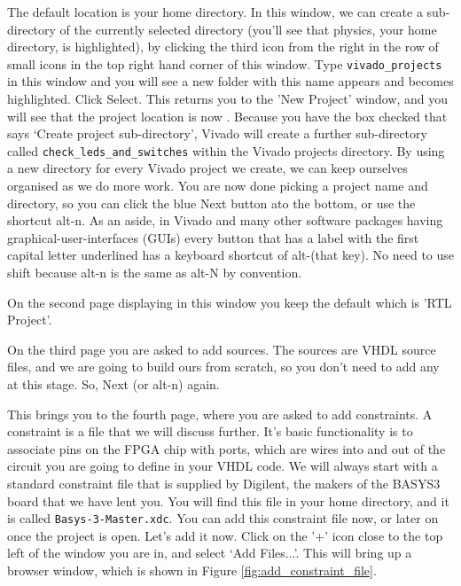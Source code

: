 \documentclass[../physical_computing.tex]{subfiles}
\begin{document}
The default location is your home directory. In this window, we can create a sub-directory of the currently selected directory (you'll see that physics, your home directory, is highlighted), by clicking the third icon from the right in the row of small icons in the top right hand corner of this window. Type \texttt{vivado\_projects} in this window and you will see a new folder with this name appears and becomes highlighted. Click Select. This returns you to the 'New Project' window, and you will see that the project location is now . Because you have the box checked that says `Create project sub-directory', Vivado will create a further sub-directory called \texttt{check\_leds\_and\_switches} within the Vivado projects directory. By using a new directory for every Vivado project we create, we can keep ourselves organised as we do more work. You are now done picking a project name and directory, so you can click the blue Next button ato the bottom, or use the shortcut alt-n. As an aside, in Vivado and many other software packages having graphical-user-interfaces (GUIs) every button that has a label with the first capital letter underlined has a keyboard shortcut of alt-(that key). No need to use shift because alt-n is the same as alt-N by convention. 

On the second page displaying in this window you keep the default which is 'RTL Project'.

On the third page you are asked to add sources. The sources are VHDL source files, and we are going to build ours from scratch, so you don't need to add any at this stage. So, Next (or alt-n) again. 

This brings you to the fourth page, where you are asked to add constraints. A constraint is a file that we will discuss further. It's basic functionality is to associate pins on the FPGA chip with ports, which are wires into and out of the circuit you are going to define in your VHDL code. We will always start with a standard constraint file that is supplied by Digilent, the makers of the BASYS3 board that we have lent you. You will find this file in your home directory, and it is called \texttt{Basys-3-Master.xdc}. You can add this constraint file now, or later on once the project is open. Let's add it now. Click on the '+' icon close to the top left of the window you are in, and select `Add Files...'. This will bring up a browser window, which is shown in Figure \ref{fig:add_constraint_file}.
\end{document}
